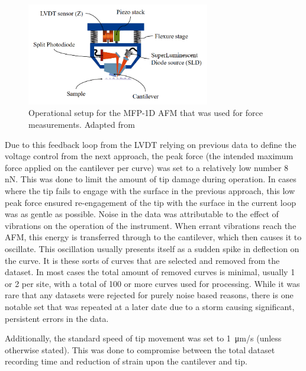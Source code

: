 \begin{figure}[h!]     %
        \begin{center}
          \includegraphics[width=80mm]{chapter2/Head.PNG}
\end{center}
\caption{Operational setup for the MFP-1D AFM that was used for force measurements. Adapted from \cite{AFMTalk}} %
\label{fig:Head.jpg}                 %
\end{figure}


Due to this feedback loop from the LVDT relying on previous data to define the voltage control from the next approach, the peak force (the intended maximum force applied on the cantilever per curve) was set to a relatively low number 8 nN. This was done to limit the amount of tip damage during operation. In cases where the tip fails to engage with the surface in the previous approach, this low peak force ensured re-engagement of the tip with the surface in the current loop was as gentle as possible. Noise in the data was attributable to the effect of vibrations on the operation of the instrument. When errant vibrations reach the AFM, this energy is transferred through to the cantilever, which then causes it to oscillate. This oscillation usually presents itself as a sudden spike in deflection on the curve. It is these sorts of curves that are selected and removed from the dataset. In most cases the total amount of removed curves is minimal, usually 1 or 2 per site, with a total of 100 or more curves used for processing. While it was rare that any datasets were rejected for purely noise based reasons, there is one notable set that was repeated at a later date due to a storm causing significant, persistent errors in the data. 

Additionally, the standard speed of tip movement was set to \SI{1}{\micro\metre/s} (unless otherwise stated). This was done to compromise between the total dataset recording time and reduction of strain upon the cantilever and tip.

